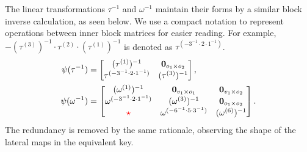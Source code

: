 \documentclass[12pt, a4paper, oneside]{memoir}
\theoremstyle{definition}
\begin{document}
The linear transformations $\tau^{-1}$ and $\omega^{-1}$ maintain their forms by a similar block inverse calculation, as seen below. We use a compact notation to represent operations between inner block matrices for easier reading. For example, $-(\tau^{(3)})^{-1} \cdot \tau^{(2)} \cdot (\tau^{(1)})^{-1}$ is denoted as $\tau^{(-3^{-1} \cdot 2 \cdot 1^{-1})}$.
\begin{align}
  \begin{split}
    \psi(\tau^{-1}) &=
    \begin{bmatrix}
      (\tau^{(1)})^{-1} & \mathbf{0}_{o_{1} \times o_{2}} \\
      \tau^{(-3^{-1} \cdot 2 \cdot 1^{-1})} & (\tau^{(3)})^{-1} \\
    \end{bmatrix}, \\
    \psi(\omega^{-1}) &=
    \begin{bmatrix}
      (\omega^{(1)})^{-1} & \mathbf{0}_{v_{1} \times o_{1}} & \mathbf{0}_{v_{1} \times o_{2}} \\
      \omega^{(-3^{-1} \cdot 2 \cdot 1^{-1})} & (\omega^{(3)})^{-1} & \mathbf{0}_{o_{1} \times o_{2}} \\
      {\color{red} \star} & \omega^{(-6^{-1} \cdot 5 \cdot 3^{-1})} & (\omega^{(6)})^{-1} \\
    \end{bmatrix}.
  \end{split}
\end{align}
The redundancy is removed by the same rationale, observing the shape of the lateral maps in the equivalent key.
\end{document}

